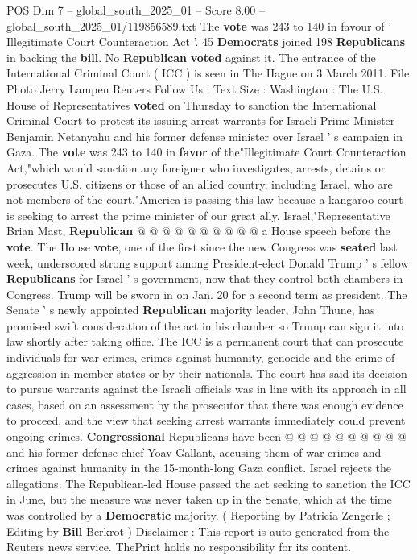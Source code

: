 \begin{textsample}{POS Dim 7 – global\_south\_2025\_01 – Score 8.00 – global\_south\_2025\_01/119856589.txt}  \label{ex:f7_pos_337}
The \textbf{vote} was 243 to 140 in favour of ' Illegitimate Court Counteraction Act '. 45 \textbf{Democrats} joined 198 \textbf{Republicans} in backing the \textbf{bill}.
No \textbf{Republican} \textbf{voted} against it.
The entrance of the International Criminal Court ( ICC ) is seen in The Hague on 3 March 2011.
File Photo Jerry Lampen Reuters Follow Us : Text Size : Washington : The U.S.
House of Representatives \textbf{voted} on Thursday to sanction the International Criminal Court to protest its issuing arrest warrants for Israeli Prime Minister Benjamin Netanyahu and his former defense minister over Israel ' s campaign in Gaza.
The \textbf{vote} was 243 to 140 in \textbf{favor} of the"Illegitimate Court Counteraction Act,"which would sanction any foreigner who investigates, arrests, detains or prosecutes U.S. citizens or those of an allied country, including Israel, who are not members of the court."America is passing this law because a kangaroo court is seeking to arrest the prime minister of our great ally, Israel,"Representative Brian Mast, \textbf{Republican} @ @ @ @ @ @ @ @ @ @ a House speech before the \textbf{vote}.
The House \textbf{vote}, one of the first since the new Congress was \textbf{seated} last week, underscored strong support among President-elect Donald Trump ' s fellow \textbf{Republicans} for Israel ' s government, now that they control both chambers in Congress.
Trump will be sworn in on Jan. 20 for a second term as president.
The Senate ' s newly appointed \textbf{Republican} majority leader, John Thune, has promised swift consideration of the act in his chamber so Trump can sign it into law shortly after taking office.
The ICC is a permanent court that can prosecute individuals for war crimes, crimes against humanity, genocide and the crime of aggression in member states or by their nationals.
The court has said its decision to pursue warrants against the Israeli officials was in line with its approach in all cases, based on an assessment by the prosecutor that there was enough evidence to proceed, and the view that seeking arrest warrants immediately could prevent ongoing crimes. \textbf{Congressional} Republicans have been @ @ @ @ @ @ @ @ @ @ and his former defense chief Yoav Gallant, accusing them of war crimes and crimes against humanity in the 15-month-long Gaza conflict.
Israel rejects the allegations.
The Republican-led House passed the act seeking to sanction the ICC in June, but the measure was never taken up in the Senate, which at the time was controlled by a \textbf{Democratic} majority. ( Reporting by Patricia Zengerle ; Editing by \textbf{Bill} Berkrot ) Disclaimer : This report is auto generated from the Reuters news service.
ThePrint holds no responsibility for its content.

\end{textsample}
